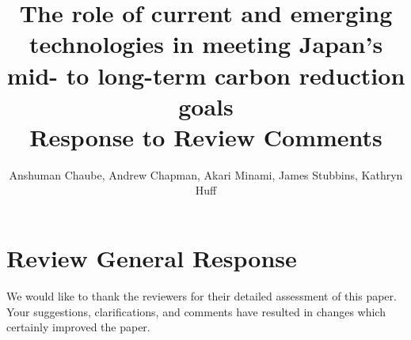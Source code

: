 \documentclass[answers,11pt]{exam}
\begin{document}


%

\title{The role of current and emerging technologies in meeting Japan's mid- to long-term carbon reduction goals\\
\large Response to Review Comments}
\author{Anshuman Chaube, Andrew Chapman, Akari Minami, James Stubbins, Kathryn Huff}



%
\maketitle
\section*{Review General Response}
We would like to thank the reviewers for their detailed assessment of
this paper. Your suggestions, clarifications, and comments have resulted in 
changes which certainly improved the paper.
\end{document}
